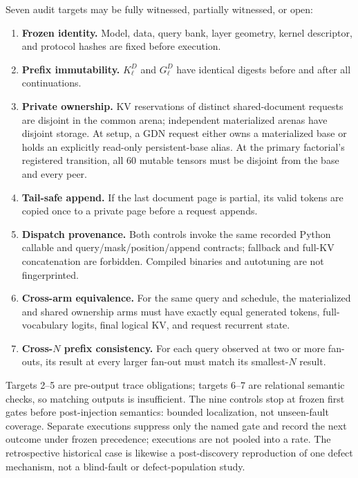 \documentclass{article}
\begin{document}
Seven audit targets may be fully witnessed, partially witnessed, or open:
\FloatBarrier
\begin{enumerate}
  \setlength{\itemsep}{1pt}
  \setlength{\parskip}{0pt}
  \item \textbf{Frozen identity.}  Model, data, query bank, layer geometry,
  kernel descriptor, and protocol hashes are fixed before execution.
  \item \textbf{Prefix immutability.}  $K^D_\ell$ and $G^D_\ell$ have identical
  digests before and after all continuations.
  \item \textbf{Private ownership.}  KV reservations of distinct
  shared-document requests are disjoint in the common arena; independent
  materialized arenas have disjoint storage.  At setup, a GDN request either
  owns a materialized base or holds an explicitly read-only persistent-base
  alias.  At the primary factorial's registered transition, all 60 mutable tensors must be
  disjoint from the base and every peer.
  \item \textbf{Tail-safe append.}  If the last document page is partial, its
  valid tokens are copied once to a private page before a request appends.
  \item \textbf{Dispatch provenance.}  Both controls invoke the same recorded
  Python callable and query/mask/position/append contracts; fallback and
  full-KV concatenation are forbidden.  Compiled binaries and autotuning are
  not fingerprinted.
  \item \textbf{Cross-arm equivalence.}  For the same query and schedule, the
  materialized and shared ownership arms must have exactly equal generated
  tokens, full-vocabulary logits, final logical KV, and request recurrent
  state.
  \item \textbf{Cross-$N$ prefix consistency.}  For each query observed at two or more
  fan-outs, its result at every larger fan-out must match its smallest-$N$
  result.
\end{enumerate}

Targets 2--5 are pre-output trace obligations; targets 6--7 are relational
semantic checks, so matching outputs is insufficient.  The nine controls stop
at frozen first gates before post-injection semantics: bounded localization,
not unseen-fault coverage.  Separate executions suppress only the named gate
and record the next outcome under frozen precedence; executions are not pooled
into a rate.  The retrospective historical case is likewise a post-discovery
reproduction of one defect mechanism, not a blind-fault or defect-population
study.
\end{document}
